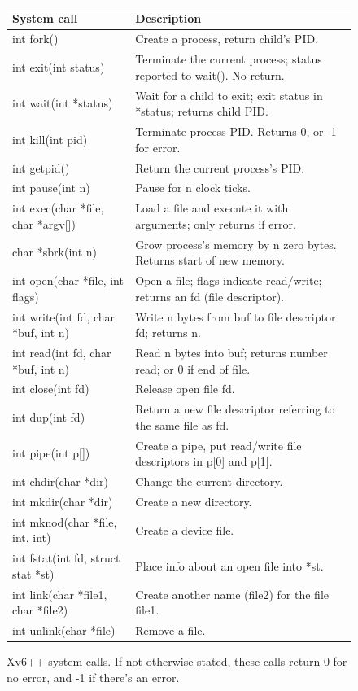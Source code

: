 \begin{figure}[H]
\center
\begin{tabular}{ll}
{\bf System call} & {\bf Description} \\
\midrule
int fork() & Create a process, return child's PID. \\
int exit(int status) & Terminate the current process; status reported to wait(). No return. \\
int wait(int *status) & Wait for a child to exit; exit status in *status; returns child PID. \\
int kill(int pid) & Terminate process PID. Returns 0, or -1 for error. \\
int getpid() & Return the current process's PID. \\
int pause(int n) & Pause for n clock ticks. \\
int exec(char *file, char *argv[]) & Load a file and execute it with arguments; only returns if error. \\
char *sbrk(int n) & Grow process's memory by n zero bytes. Returns start of new memory. \\
int open(char *file, int flags) & Open a file; flags indicate read/write; returns an fd (file descriptor). \\
int write(int fd, char *buf, int n) & Write n bytes from buf to file descriptor fd; returns n. \\
int read(int fd, char *buf, int n) & Read n bytes into buf; returns number read; or 0 if end of file. \\
int close(int fd) & Release open file fd. \\
int dup(int fd) & Return a new file descriptor referring to the same file as fd.\\
int pipe(int p[]) & Create a pipe, put read/write file descriptors in p[0] and p[1]. \\
int chdir(char *dir) & Change the current directory. \\
int mkdir(char *dir) & Create a new directory. \\
int mknod(char *file, int, int) & Create a device file. \\
int fstat(int fd, struct stat *st) & Place info about an open file into *st. \\
int link(char *file1, char *file2) & Create another name (file2) for the file file1. \\
int unlink(char *file) & Remove a file. \\
\end{tabular}
\caption{Xv6++ system calls. If not otherwise stated, these calls return
0 for no error, and -1 if there's an error.}
\label{fig:api}
\end{figure}

